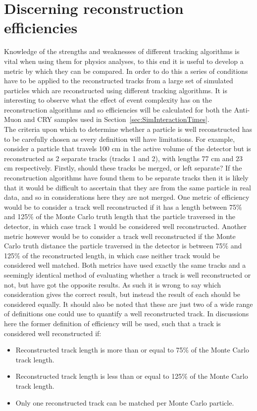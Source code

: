 \section{Discerning reconstruction efficiencies} \label{sec:SimRecoEffic} %
Knowledge of the strengths and weaknesses of different tracking algorithms is vital when using them for physics analyses, to this end it is useful to develop a metric by which they can be compared. In order to do this a series of conditions have to be applied to the reconstructed tracks from a large set of simulated particles which are reconstructed using different tracking algorithms. It is interesting to observe what the effect of event complexity has on the reconstruction algorithms and so efficiencies will be calculated for both the Anti-Muon and CRY samples used in Section~\ref{sec:SimInteractionTimes}. \\

The criteria upon which to determine whether a particle is well reconstructed has to be carefully chosen as every definition will have limitations. For example, consider a particle that travels 100 cm in the active volume of the detector but is reconstructed as 2 separate tracks (tracks 1 and 2), with lengths 77 cm and 23 cm respectively. Firstly, should these tracks be merged, or left separate? If the reconstruction algorithms have found them to be separate tracks then it is likely that it would be difficult to ascertain that they are from the same particle in real data, and so in considerations here they are not merged. One metric of efficiency would be to consider a track well reconstructed if it has a length between 75$\%$ and 125$\%$ of the Monte Carlo truth length that the particle traversed in the detector, in which case track 1 would be considered well reconstructed. Another metric however would be to consider a track well reconstructed if the Monte Carlo truth distance the particle traversed in the detector is between 75$\%$ and 125$\%$ of the reconstructed length, in which case neither track would be considered well matched. Both metrics have used exactly the same tracks and a seemingly identical method of evaluating whether a track is well reconstructed or not, but have got the opposite results. As such it is wrong to say which consideration gives the correct result, but instead the result of each should be considered equally. It should also be noted that these are just two of a wide range of definitions one could use to quantify a well reconstructed track. In discussions here the former definition of efficiency will be used, such that a track is considered well reconstructed if:
\begin{itemize}
\item Reconstructed track length is more than or equal to 75$\%$ of the Monte Carlo track length.
\item Reconstructed track length is less than or equal to 125$\%$ of the Monte Carlo track length.
\item Only one reconstructed track can be matched per Monte Carlo particle.
\end{itemize}

